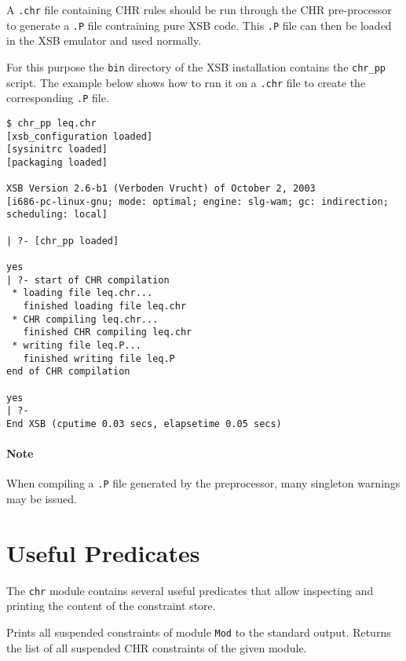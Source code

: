 A \texttt{.chr} file containing CHR rules should be run through the CHR pre-processor
to generate a \texttt{.P} file contraining pure XSB code. This \texttt{.P} file can then be
loaded in the XSB emulator and used normally.

For this purpose the \texttt{bin} directory of the XSB installation contains
the \texttt{chr\_pp} script. The example below shows how to run it on a
\texttt{.chr} file to create the corresponding \texttt{.P} file.

\begin{verbatim}
$ chr_pp leq.chr
[xsb_configuration loaded]
[sysinitrc loaded]
[packaging loaded]

XSB Version 2.6-b1 (Verboden Vrucht) of October 2, 2003
[i686-pc-linux-gnu; mode: optimal; engine: slg-wam; gc: indirection; scheduling: local]

| ?- [chr_pp loaded]

yes
| ?- start of CHR compilation
 * loading file leq.chr...
   finished loading file leq.chr
 * CHR compiling leq.chr...
   finished CHR compiling leq.chr
 * writing file leq.P...
   finished writing file leq.P
end of CHR compilation

yes
| ?-
End XSB (cputime 0.03 secs, elapsetime 0.05 secs)
\end{verbatim}

\paragraph{Note}

When compiling a \texttt{.P} file generated by the preprocessor, many singleton
warnings may be issued.


\section{Useful Predicates} \label{predicates}

The \texttt{chr} module contains several useful predicates that allow
inspecting and printing the content of the constraint store.

\begin{description}
  Prints all suspended constraints of module \texttt{Mod} to
  the standard output.
  Returns the list of all suspended CHR constraints of the given module.
\end{description}

